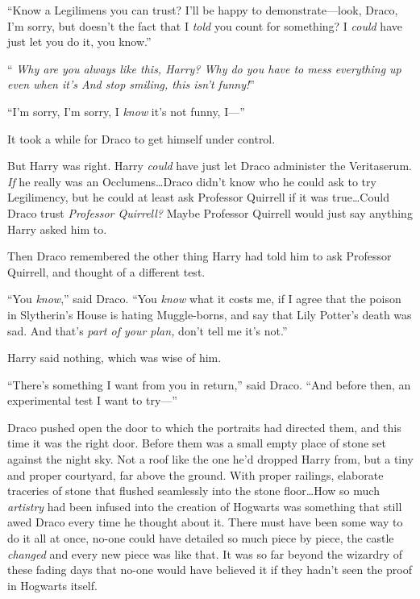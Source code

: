 “Know a Legilimens you can trust? I’ll be happy to demonstrate—look, Draco, I’m sorry, but doesn’t the fact that I \emph{told} you count for something? I \emph{could} have just let you do it, you know.”

“\emph{ Why are you always like this, Harry? Why do you have to mess everything up even when it’s  And stop smiling, this isn’t funny!}”

“I’m sorry, I’m sorry, I \emph{know} it’s not funny, I—”

It took a while for Draco to get himself under control.

But Harry was right. Harry \emph{could} have just let Draco administer the Veritaserum. \emph{If} he really was an Occlumens…Draco didn’t know who he could ask to try Legilimency, but he could at least ask Professor Quirrell if it was true…Could Draco trust \emph{Professor Quirrell?} Maybe Professor Quirrell would just say anything Harry asked him to.

Then Draco remembered the other thing Harry had told him to ask Professor Quirrell, and thought of a different test.

“You \emph{know},” said Draco. “You \emph{know} what it costs me, if I agree that the poison in Slytherin’s House is hating Muggle-borns, and say that Lily Potter’s death was sad. And that’s \emph{part of your plan,} don’t tell me it’s not.”

Harry said nothing, which was wise of him.

“There’s something I want from you in return,” said Draco. “And before then, an experimental test I want to try—”

\later

Draco pushed open the door to which the portraits had directed them, and this time it was the right door. Before them was a small empty place of stone set against the night sky. Not a roof like the one he’d dropped Harry from, but a tiny and proper courtyard, far above the ground. With proper railings, elaborate traceries of stone that flushed seamlessly into the stone floor…How so much \emph{artistry} had been infused into the creation of Hogwarts was something that still awed Draco every time he thought about it. There must have been some way to do it all at once, no-one could have detailed so much piece by piece, the castle \emph{changed} and every new piece was like that. It was so far beyond the wizardry of these fading days that no-one would have believed it if they hadn’t seen the proof in Hogwarts itself.

